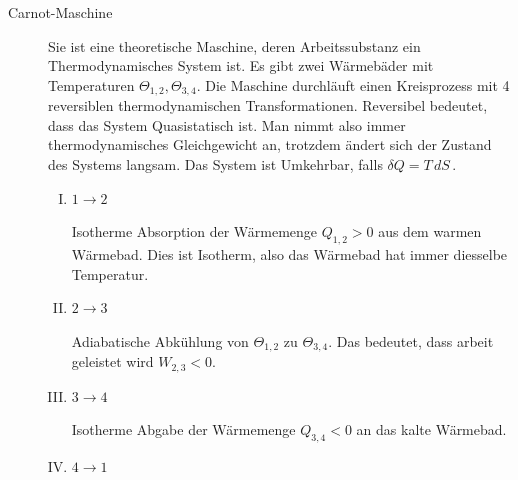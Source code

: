 \documentclass[11pt]{article}
\theoremstyle{plain}
\theoremstyle{mytheoremstyle}
\renewcommand{\d}[1]{\,d#1\,}
\begin{document}
\begin{description}
  \item[Carnot-Maschine] 
    Sie ist eine theoretische Maschine, deren Arbeitssubstanz
    ein Thermodynamisches System ist. Es gibt zwei W\"armeb\"ader mit Temperaturen
    $\Theta_{1,2}, \Theta_{3,4}$. Die Maschine durchl\"auft einen Kreisprozess mit
    4 reversiblen thermodynamischen Transformationen.
    Reversibel bedeutet, dass das System Quasistatisch ist. Man nimmt also 
    immer thermodynamisches Gleichgewicht an, trotzdem \"andert sich der Zustand des Systems
    langsam.
    Das System ist Umkehrbar, falls $\delta Q = T \d{S}$.
    \begin{enumerate}[I)]
      \item $1\to2$ 
        
        Isotherme Absorption der W\"armemenge $Q_{1,2} > 0$ aus dem warmen
        W\"armebad. Dies ist Isotherm, also das W\"armebad hat immer diesselbe Temperatur.

      \item $2\to3$
        
        Adiabatische Abk\"uhlung von $\Theta_{1,2}$ zu $\Theta_{3,4}$.
        Das bedeutet, dass arbeit geleistet wird $W_{2,3} < 0$.

      \item $3\to4$

        Isotherme Abgabe der W\"armemenge $Q_{3,4} < 0$ an das kalte W\"armebad.

      \item $4\to1$


\end{enumerate}
\end{description}
\end{document}
